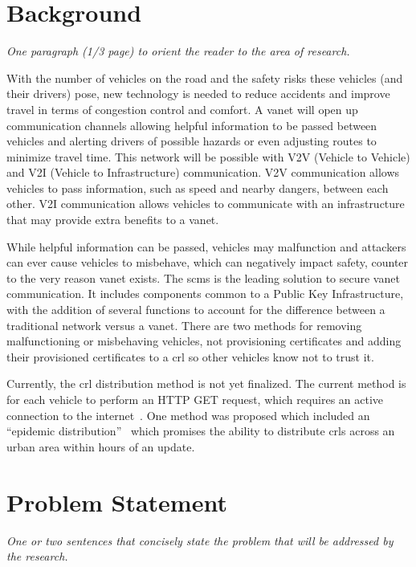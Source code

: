 \documentclass {article}
\newcommand{\sechint}[1]{\small{\emph{#1}} \bigskip}
\begin{document}
\tableofcontents
\pagebreak

\section{Background}{\sechint{One paragraph (1/3 page) to orient the reader to the area of research.}}

With the number of vehicles on the road and the safety risks these vehicles (and their drivers) pose, new technology is needed to reduce accidents and improve travel in terms of congestion control and comfort. A \gls{vanet} will open up communication channels allowing helpful information to be passed between vehicles and alerting drivers of possible hazards or even adjusting routes to minimize travel time. This network will be possible with V2V (Vehicle to Vehicle) and V2I (Vehicle to Infrastructure) communication. V2V communication allows vehicles to pass information, such as speed and nearby dangers, between each other. V2I communication allows vehicles to communicate with an infrastructure that may provide extra benefits to a \gls{vanet}.

While helpful information can be passed, vehicles may malfunction and attackers can ever cause vehicles to misbehave, which can negatively impact safety, counter to the very reason \gls{vanet} exists. The \gls{scms} is the leading solution to secure \gls{vanet} communication. It includes components common to a Public Key Infrastructure, with the addition of several functions to account for the difference between a traditional network versus a \gls{vanet}. There are two methods for removing malfunctioning or misbehaving vehicles, not provisioning certificates and adding their provisioned certificates to a \gls{crl} so other vehicles know not to trust it.

Currently, the \gls{crl} distribution method is not yet finalized. The current method is for each vehicle to perform an HTTP GET request, which requires an active connection to the internet~\autocite{brecht_scms_nodate}. One method was proposed which included an ``epidemic distribution''~\autocite{haas_efficient_2011} which promises the ability to distribute \gls{crl}s across an urban area within hours of an update.

\section{Problem Statement}{\sechint{One or two sentences that concisely state the problem that will be addressed by the research.}}
\end{document}

